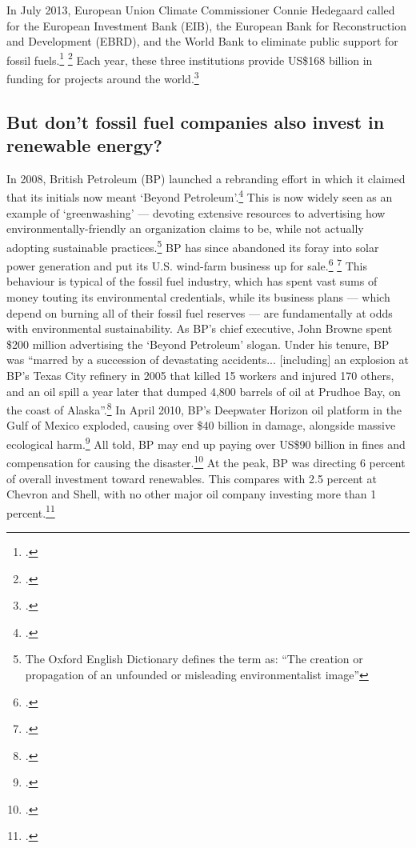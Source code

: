 \documentclass[10pt]{article}
\begin{document}
In July 2013, European Union Climate Commissioner Connie Hedegaard called for the European Investment Bank (EIB), the European Bank for Reconstruction and Development (EBRD), and the World Bank to eliminate public support for fossil fuels.\footcite[][p. 9--10]{InvestHasteRepent} \footcite[See also:][]{HedegaardAppeal}
Each year, these three institutions provide US\$168 billion in funding for projects around the world.\footcite[][p. 10]{InvestHasteRepent}


	
	\subsection{But don't fossil fuel companies also invest in renewable energy?}
	\label{RenewableInvest}



In 2008, British Petroleum (BP) launched a rebranding effort in which it claimed that its initials now meant `Beyond Petroleum'.\footcite[][]{GreenwashBP}
This is now widely seen as an example of `greenwashing' --- devoting extensive resources to advertising how environmentally-friendly an organization claims to be, while not actually adopting sustainable practices.\footnote{The Oxford English Dictionary defines the term as: ``The creation or propagation of an unfounded or misleading environmentalist image''}
BP has since abandoned its foray into solar power generation and put its U.S. wind-farm business up for sale.\footcite[][]{BPNoLongerBeyond} \footcite[][]{BPNoMore}
This behaviour is typical of the fossil fuel industry, which has spent vast sums of money touting its environmental credentials, while its business plans --- which depend on burning all of their fossil fuel reserves --- are fundamentally at odds with environmental sustainability.
As BP's chief executive, John Browne spent \$200 million advertising the `Beyond Petroleum' slogan.
Under his tenure, BP was ``marred by a succession of devastating accidents... [including] an explosion at BP's Texas City refinery in 2005 that killed 15 workers and injured 170 others, and an oil spill a year later that dumped 4,800 barrels of oil at Prudhoe Bay, on the coast of Alaska''.\footcite[][]{BlackStuffBP}
In April 2010, BP's Deepwater Horizon oil platform in the Gulf of Mexico exploded, causing over \$40 billion in damage, alongside massive ecological harm.\footcite[][]{OffshoreLiability}
All told, BP may end up paying over US\$90 billion in fines and compensation for causing the disaster.\footcite[][p. 20]{Supermajordammerung}
At the peak, BP was directing 6 percent of overall investment toward renewables.
This compares with 2.5 percent at Chevron and Shell, with no other major oil company investing more than 1 percent.\footcite[][]{RSBigOilLies}
\end{document}
